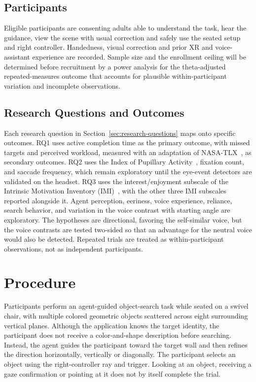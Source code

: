 \subsection{Participants}
Eligible participants are consenting adults able to understand the task, hear the guidance, view the scene with usual correction and safely use the seated setup and right controller. Handedness, visual correction and prior XR and voice-assistant experience are recorded. Sample size and the enrollment ceiling will be determined before recruitment by a power analysis for the theta-adjusted repeated-measures outcome that accounts for plausible within-participant variation and incomplete observations.

\subsection{Research Questions and Outcomes}
Each research question in Section~\ref{sec:research-questions} maps onto specific outcomes. RQ1 uses active completion time as the primary outcome, with missed targets and perceived workload, measured with an adaptation of NASA-TLX~\cite{hart1988nasatlx}, as secondary outcomes. RQ2 uses the Index of Pupillary Activity~\cite{duchowski2018ipa}, fixation count, and saccade frequency, which remain exploratory until the eye-event detectors are validated on the headset. RQ3 uses the interest/enjoyment subscale of the Intrinsic Motivation Inventory (IMI)~\cite{ryan1982control,mcauley1989imi}, with the other three IMI subscales reported alongside it. Agent perception, eeriness, voice experience, reliance, search behavior, and variation in the voice contrast with starting angle are exploratory. The hypotheses are directional, favoring the self-similar voice, but the voice contrasts are tested two-sided so that an advantage for the neutral voice would also be detected. Repeated trials are treated as within-participant observations, not as independent participants.


\section{Procedure}
Participants perform an agent-guided object-search task while seated on a swivel chair, with multiple colored geometric objects scattered across eight surrounding vertical planes. Although the application knows the target identity, the participant does not receive a color-and-shape description before searching. Instead, the agent guides the participant toward the target wall and then refines the direction horizontally, vertically or diagonally. The participant selects an object using the right-controller ray and trigger. Looking at an object, receiving a gaze confirmation or pointing at it does not by itself complete the trial.

